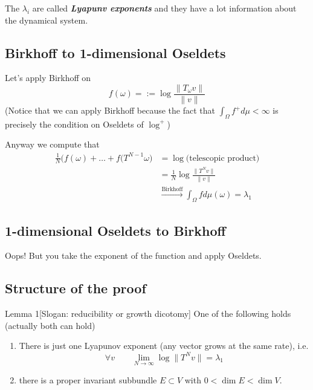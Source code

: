 The \(\lambda_i\) are called \textit{\textbf{Lyapunv exponents}} and they have a lot information about the dynamical system.

\subsection{Birkhoff to 1-dimensional Oseldets}
Let's apply Birkhoff on
\[f(\omega)=:=\operatorname{log}\frac{\|T_\omega v\|}{\| v\|}\]
(Notice that we can apply Birkhoff because the fact that \(\int_\Omega f^+ d\mu< \infty\) is precisely the  condition on Oseldets of \(\operatorname{log}^+\))

Anyway we compute that
\begin{align*}
	\frac{1}{N}\Big(f(\omega)+\ldots+f(T^{N-1}\omega\Big)&=\operatorname{log}\Big(\text{telescopic product} \Big)\\
	&=\frac{1}{N}\operatorname{log}\frac{\|T^Nv\|}{\|v\|}\\
	&\overset{\text{Birkhoff} }{\to}\int_\Omega f d \mu(\omega)=\lambda_1
\end{align*}

\subsection{1-dimensional Oseldets to Birkhoff}
Oops! But you take the exponent of the function and apply Oseldets.

\subsection{Structure of the proof}

\begin{thing7}{Lemma 1}[Slogan: reducibility or growth dicotomy]\leavevmode
One of the following holds (actually both can hold)
\begin{enumerate}
\item There is just one Lyapunov exponent (any vector grows at the same rate), i.e.
	\[\forall v\qquad \lim_{N \to \infty} \operatorname{log}\|T^N v\|=\lambda_1\]
\item there is a proper invariant subbundle \(E \subset V\) with \(0<\dim E< \dim V\).
\end{enumerate}
\end{thing7}

